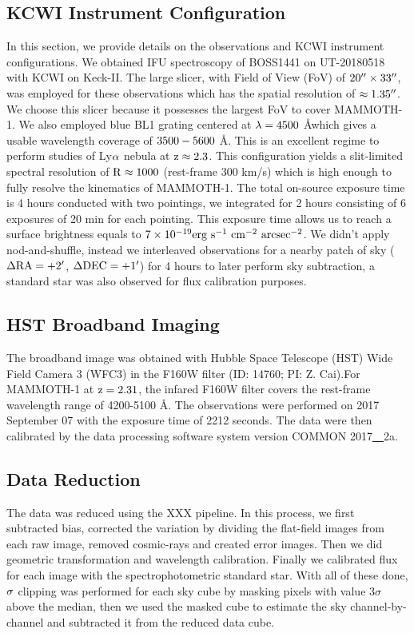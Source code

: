 \documentclass[../main.tex]{subfiles}
\begin{document}
\subsection{KCWI Instrument Configuration}
In this section, we provide details on the observations and KCWI instrument configurations. We obtained IFU spectroscopy of BOSS1441 on UT-20180518 with KCWI on Keck-II. The large slicer, with Field of View (FoV) of $\rm 20\mbox{$^{\prime\prime}$} \times 33\mbox{$^{\prime\prime}$}$, was employed for these observations which has the spatial resolution of $\rm \approx 1.35\mbox{$^{\prime\prime}$}$. We choose this slicer because it possesses the largest FoV to cover MAMMOTH-1. We also employed blue BL1 grating centered at $\rm \lambda=4500$ \AA which gives a usable wavelength coverage of $\rm 3500-5600$ \AA. This is an excellent regime to perform studies of Ly$\rm \alpha$ nebula at $\rm z\approx 2.3$. This configuration yields a slit-limited spectral resolution of $\rm R \approx 1000$ (rest-frame 300 km/s) which is high enough to fully resolve the kinematics of MAMMOTH-1. The total on-source exposure time is 4 hours conducted with two pointings, we integrated for 2 hours consisting of 6 exposures of 20 min for each pointing. This exposure time allows us to reach a surface brightness equals to $\rm 7\times 10^{-19}\rm erg \ s^{-1} \ cm^{-2} \ arcsec^{-2}$. We didn't apply nod-and-shuffle, instead we interleaved observations for a nearby patch of sky ($\rm \Delta RA=+2\mbox{$^\prime$}$, $\rm \Delta DEC=+1\mbox{$^\prime$}$) for 4 hours to later perform sky subtraction, a standard star was also observed for flux calibration purposes.
\subsection{HST Broadband Imaging}
The broadband image was obtained with Hubble Space Telescope (HST) Wide Field Camera 3 (WFC3) in the F160W filter (ID: 14760; PI: Z. Cai).For MAMMOTH-1 at $\rm z=2.31$, the infared F160W filter covers the rest-frame wavelength range of 4200-5100 \AA. The observations were performed on 2017 September 07 with the exposure time of 2212 seconds. The data were then calibrated by the data processing software system version COMMON  2017\underline{~~}2a.
\subsection{Data Reduction}
The data was reduced using the XXX pipeline. In this process, we first subtracted bias, corrected the variation by dividing the flat-field images from each raw image, removed cosmic-rays and created error images. Then we did geometric transformation and wavelength calibration. Finally we calibrated flux for each image with the spectrophotometric standard star. With all of these done, $\rm \sigma$ clipping was performed for each sky cube by masking pixels with value $3\sigma$ above the median, then we used the masked cube to estimate the sky channel-by-channel and subtracted it from the reduced data cube. 
\end{document}

